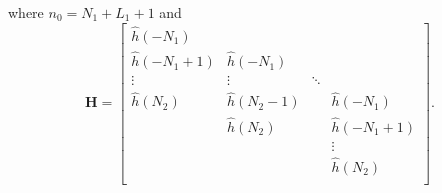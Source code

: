 where $n_0 = N_1+L_1+1$ and
\begin{equation} 
\mathbf{H} = 
		\begin{bmatrix}
		\hat{h}(-N_1)		&  				& 		 	&  					\\
		\hat{h}(-N_1+1) 	& \hat{h}(-N_1)	& 		 	&  					\\
		\vdots	 			& \vdots		& \ddots 	&  					\\
		\hat{h}(N_2)		& \hat{h}(N_2-1)&  			& \hat{h}(-N_1)  	\\
		 					& \hat{h}(N_2) 	&  			& \hat{h}(-N_1+1) 	\\
		 					&  	   			&  			& \vdots			\\
		 					&  	   			&  			& \hat{h}(N_2)		\\
	\end{bmatrix}.
\end{equation}

